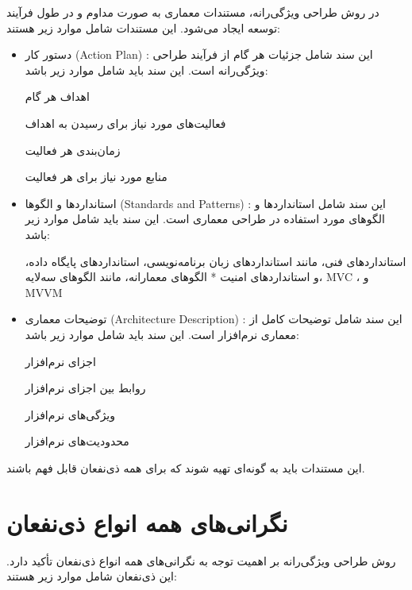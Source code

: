 در روش طراحی ویژگی‌رانه، مستندات معماری به صورت مداوم و در طول فرآیند توسعه ایجاد می‌شود. این مستندات شامل موارد زیر هستند:

\begin{itemize}
	\item دستور کار (Action Plan) : 
	این سند شامل جزئیات هر گام از فرآیند طراحی ویژگی‌رانه است. این سند باید شامل موارد زیر باشد:
	
	اهداف هر گام
	
	فعالیت‌های مورد نیاز برای رسیدن به اهداف
	
	زمان‌بندی هر فعالیت
	
	منابع مورد نیاز برای هر فعالیت
	\item استانداردها و الگوها (Standards and Patterns) :
	این سند شامل استانداردها و الگوهای مورد استفاده در طراحی معماری است. این سند باید شامل موارد زیر باشد:
	
	استانداردهای فنی، مانند استانداردهای زبان برنامه‌نویسی، استانداردهای پایگاه داده، و استانداردهای امنیت
	* الگوهای معمارانه، مانند الگوهای سه‌لایه، MVC ، و MVVM
	\item توضیحات معماری (Architecture Description) :
	این سند شامل توضیحات کامل از معماری نرم‌افزار است. این سند باید شامل موارد زیر باشد:
	
	اجزای نرم‌افزار
	
	روابط بین اجزای نرم‌افزار
	
	ویژگی‌های نرم‌افزار
	
	محدودیت‌های نرم‌افزار
\end{itemize}

این مستندات باید به گونه‌ای تهیه شوند که برای همه ذی‌نفعان قابل فهم باشند.

\section{نگرانی‌های همه انواع ذی‌نفعان}

روش طراحی ویژگی‌رانه بر اهمیت توجه به نگرانی‌های همه انواع ذی‌نفعان تأکید دارد. این ذی‌نفعان شامل موارد زیر هستند:

